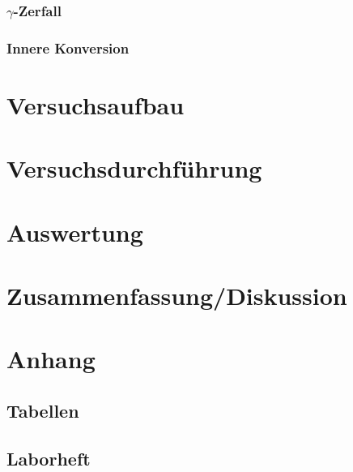 \documentclass[12pt]{article}
\begin{document}
\subsubsection{$\gamma$-Zerfall}
\subsubsection{Innere Konversion}


\newpage
\section{Versuchsaufbau}


\newpage
\section{Versuchsdurchführung}



\newpage
\section{Auswertung}


\newpage
\section{Zusammenfassung/Diskussion}


\newpage
\section{Anhang}

\subsection{Tabellen}

%


%

\newpage
\subsection{Laborheft}
\end{document}
